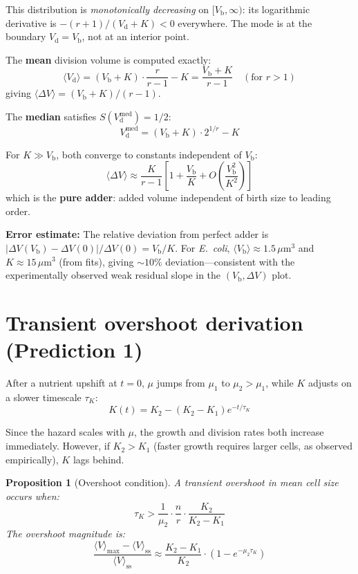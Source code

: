 \documentclass[11pt]{article}
\newtheorem{proposition}{Proposition}
\newcommand{\Vb}{V_{\mathrm{b}}}
\newcommand{\Vd}{V_{\mathrm{d}}}
\newcommand{\DV}{\Delta V}
\begin{document}
This distribution is \emph{monotonically decreasing} on
$[\Vb, \infty)$: its logarithmic derivative is
$-(r+1)/(\Vd+K) < 0$ everywhere.  The mode is at the boundary
$\Vd = \Vb$, not at an interior point.

The \textbf{mean} division volume is computed exactly:
\begin{equation}
  \langle \Vd \rangle = (\Vb + K) \cdot \frac{r}{r-1} - K
  = \frac{\Vb + K}{r-1}
  \quad (\text{for } r > 1)
\end{equation}
giving $\langle \DV \rangle = (\Vb + K)/(r-1)$.

The \textbf{median} satisfies $S(\Vd^{\mathrm{med}}) = 1/2$:
\begin{equation}
  \Vd^{\mathrm{med}} = (\Vb + K) \cdot 2^{1/r} - K
\end{equation}

For $K \gg \Vb$, both converge to constants independent of $\Vb$:
\begin{equation}
  \langle \DV \rangle \approx \frac{K}{r-1}
    \left[1 + \frac{\Vb}{K} + O\!\left(\frac{\Vb^2}{K^2}\right)\right]
\end{equation}
which is the \textbf{pure adder}: added volume independent of birth
size to leading order.

\textbf{Error estimate:} The relative deviation from perfect adder is
$|\DV(\Vb) - \DV(0)|/\DV(0) = \Vb/K$.  For \textit{E.~coli},
$\langle\Vb\rangle \approx 1.5\,\mu\mathrm{m}^3$ and
$K \approx 15\,\mu\mathrm{m}^3$ (from fits), giving $\sim 10\%$
deviation---consistent with the experimentally observed weak residual
slope in the $(\Vb, \DV)$ plot.

\section{Transient overshoot derivation (Prediction 1)}

After a nutrient upshift at $t = 0$, $\mu$ jumps from $\mu_1$ to
$\mu_2 > \mu_1$, while $K$ adjusts on a slower timescale $\tau_K$:
\begin{equation}
  K(t) = K_2 - (K_2 - K_1)e^{-t/\tau_K}
\end{equation}

Since the hazard scales with $\mu$, the growth and division rates
both increase immediately.  However, if $K_2 > K_1$ (faster growth
requires larger cells, as observed empirically), $K$ lags behind.

\begin{proposition}[Overshoot condition]
A transient overshoot in mean cell size occurs when:
\begin{equation}
  \tau_K > \frac{1}{\mu_2}\cdot\frac{n}{r}\cdot
    \frac{K_2}{K_2 - K_1}
\end{equation}
The overshoot magnitude is:
\begin{equation}
  \frac{\langle V \rangle_{\max} - \langle V \rangle_{\mathrm{ss}}}
       {\langle V \rangle_{\mathrm{ss}}}
  \approx \frac{K_2 - K_1}{K_2}\cdot\left(1 - e^{-\mu_2\tau_K}\right)
\end{equation}
\end{proposition}
\end{document}
